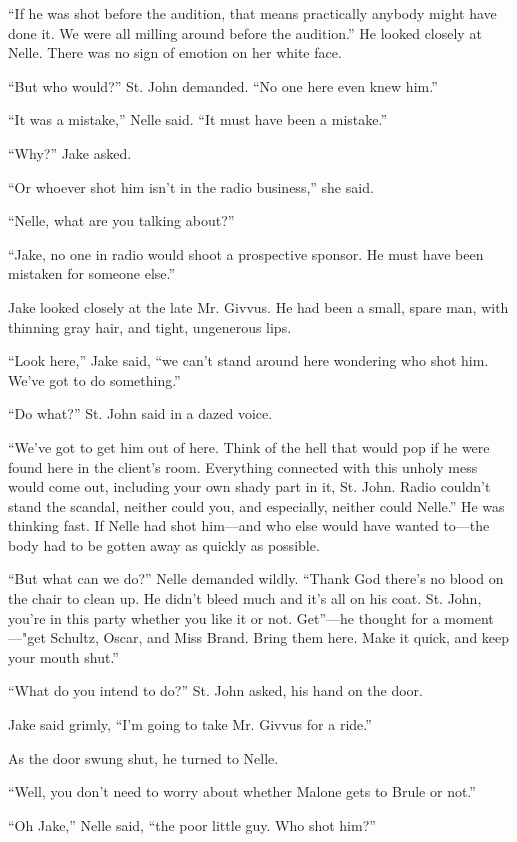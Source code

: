 \documentclass{novel}
\begin{document}
“If he was shot before the audition, that means practically anybody might have done it. We were all milling around before the audition.” He looked closely at Nelle. There was no sign of emotion on her white face.

“But who would?” St. John demanded. “No one here even knew him.”

“It was a mistake,” Nelle said. “It must have been a mistake.”

“Why?” Jake asked.

“Or whoever shot him isn’t in the radio business,” she said.

“Nelle, what are you talking about?”

“Jake, no one in radio would shoot a prospective sponsor. He must have been mistaken for someone else.”

Jake looked closely at the late Mr. Givvus. He had been a small, spare man, with thinning gray hair, and tight, ungenerous lips.

“Look here,” Jake said, “we can’t stand around here wondering who shot him. We’ve got to do something.”

“Do what?” St. John said in a dazed voice.

“We’ve got to get him out of here. Think of the hell that would pop if he were found here in the client’s room. Everything connected with this unholy mess would come out, including your own shady part in it, St. John. Radio couldn’t stand the scandal, neither could you, and especially, neither could Nelle.” He was thinking fast. If Nelle had shot him—and who else would have wanted to—the body had to be gotten away as quickly as possible.

“But what can we do?” Nelle demanded wildly. “Thank God there’s no blood on the chair to clean up. He didn’t bleed much and it’s all on his coat. St. John, you’re in this party whether you like it or not. Get”—he thought for a moment—"get Schultz, Oscar, and Miss Brand. Bring them here. Make it quick, and keep your mouth shut.”

“What do you intend to do?” St. John asked, his hand on the door.

Jake said grimly, “I’m going to take Mr. Givvus for a ride.”

As the door swung shut, he turned to Nelle.

“Well, you don’t need to worry about whether Malone gets to Brule or not.”

“Oh Jake,” Nelle said, “the poor little guy. Who shot him?”
\end{document}
